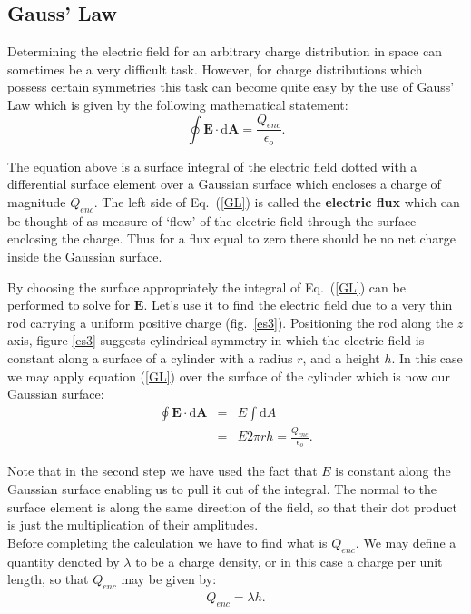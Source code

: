 {\subsection{Gauss' Law}

Determining the electric field for an arbitrary charge
distribution in space can sometimes be a very difficult task.
However, for charge distributions which possess certain
symmetries this task can become quite easy by the use of Gauss'
Law which is given by the following mathematical statement:
\begin{equation}
\oint{\mathbf{E}}\cdot\mathrm{d}{\mathbf{A}}=\frac{Q_{enc}}{\epsilon_o}.\label{GL}
\end{equation}

The equation above is a surface integral of the electric field
dotted with a  differential surface element over a Gaussian
surface which encloses a charge of magnitude $Q_{enc}$.  The left
side of Eq.~(\ref{GL}) is called the {\bf{electric flux}} which
can be thought of as measure of `flow' of the electric field
through the surface enclosing the charge.  Thus for a flux equal
to zero there should be no net charge inside the Gaussian surface.

By choosing the surface appropriately the integral of
Eq.~(\ref{GL}) can be performed to solve for $\mathbf{E}$.  Let's
use it to find the electric field due to a very thin rod carrying
a uniform positive charge (fig.~\ref{es3}).  Positioning the rod
along the $z$ axis, figure \ref{es3} suggests cylindrical symmetry
in which the electric field is constant along a surface of a
cylinder with a radius $r$, and a height $h$.  In this case we may
apply equation (\ref{GL}) over the surface of the cylinder which
is now our Gaussian surface:
\begin{eqnarray*}
\oint{\mathbf{E}}\cdot\mathrm{d}{\mathbf{A}}& = &
E\int\mathrm{d}A\\
& = & E2\pi r h= \frac{Q_{enc}}{\epsilon_{o}}.
\end{eqnarray*}



Note that in the second step we have used the fact that $E$ is
constant along the Gaussian surface enabling us to pull it out of
the integral.  The normal to the surface element is along the same
direction of the field, so that their dot product is just the
multiplication of their amplitudes.\\




Before completing the calculation we have to find what is
$Q_{enc}$.  We may define a quantity denoted by $\lambda$ to be a
charge density, or in this case a charge per unit length, so that
$Q_{enc}$ may be given by:
\begin{eqnarray*}
Q_{enc}= \lambda h.
\end{eqnarray*}

}
